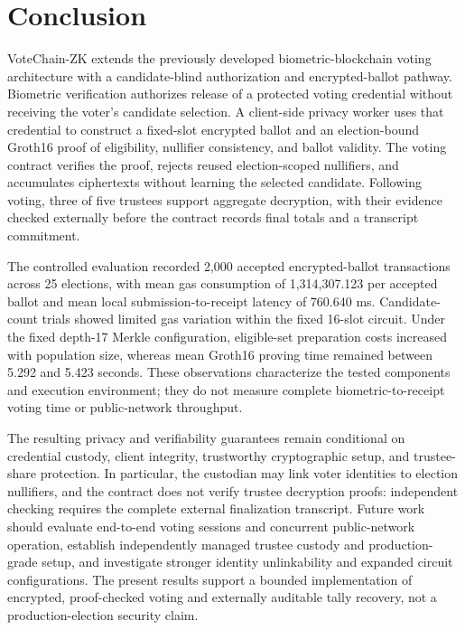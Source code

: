 \section{Conclusion}
\label{sec:10}
\label{sec:conclusion}

VoteChain-ZK extends the previously developed biometric-blockchain voting architecture
with a candidate-blind authorization and encrypted-ballot pathway. Biometric verification
authorizes release of a protected voting credential without receiving the voter's
candidate selection. A client-side privacy worker uses that credential to construct a
fixed-slot encrypted ballot and an election-bound Groth16 proof of eligibility, nullifier
consistency, and ballot validity. The voting contract verifies the proof, rejects reused
election-scoped nullifiers, and accumulates ciphertexts without learning the selected
candidate. Following voting, three of five trustees support aggregate decryption, with
their evidence checked externally before the contract records final totals and a
transcript commitment.

The controlled evaluation recorded 2,000 accepted encrypted-ballot transactions across 25
elections, with mean gas consumption of 1,314,307.123 per accepted ballot and mean local
submission-to-receipt latency of 760.640 ms. Candidate-count trials showed limited gas
variation within the fixed 16-slot circuit. Under the fixed depth-17 Merkle configuration,
eligible-set preparation costs increased with population size, whereas mean Groth16
proving time remained between 5.292 and 5.423 seconds. These observations characterize the
tested components and execution environment; they do not measure complete
biometric-to-receipt voting time or public-network throughput.

The resulting privacy and verifiability guarantees remain conditional on credential
custody, client integrity, trustworthy cryptographic setup, and trustee-share protection.
In particular, the custodian may link voter identities to election nullifiers, and the
contract does not verify trustee decryption proofs: independent checking requires the
complete external finalization transcript. Future work should evaluate end-to-end voting
sessions and concurrent public-network operation, establish independently managed trustee
custody and production-grade setup, and investigate stronger identity unlinkability and
expanded circuit configurations. The present results support a bounded implementation of
encrypted, proof-checked voting and externally auditable tally recovery, not a
production-election security claim.
